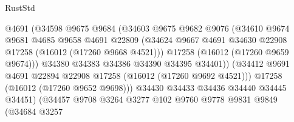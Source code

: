 \begin{lexlean}{RustStd}
\begin{coremodule}
                                    @4691
                                    (@34598
                                      @9675
                                      @9684
                                      (@34603
                                        @9675
                                        @9682
                                        @9076
                                        (@34610
                                          @9674
                                          @9681
                                          @4685
                                          @9658
                                          @4691
                                          @22809
                                          (@34624
                                            @9667
                                            @4691
                                            @34630
                                            @22908
                                            @17258
                                            (@16012 (@17260 @9668 @4521)))
                                          @17258
                                          (@16012 (@17260 @9659 @9674)))
                                        @34380
                                        @34383
                                        @34386
                                        @34390
                                        @34395
                                        @34401))
                                    (@34412
                                      @9691
                                      @4691
                                      @22894
                                      @22908
                                      @17258
                                      (@16012 (@17260 @9692 @4521)))
                                    @17258
                                    (@16012 (@17260 @9652 @9698)))
                                  @34430
                                  @34433
                                  @34436
                                  @34440
                                  @34445
                                  @34451)
                                (@34457
                                  @9708
                                  @3264
                                  @3277
                                  @102
                                  @9760
                                  @9778
                                  @9831
                                  @9849
                                  (@34684
                                    @3257

\end{coremodule}
\end{lexlean}
